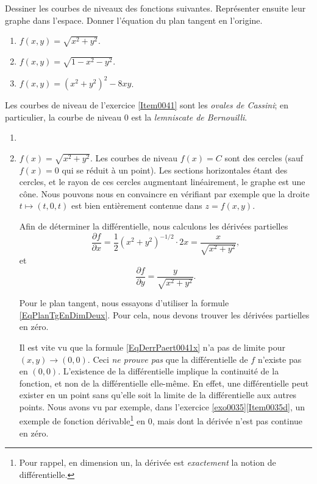 \begin{example}     \label{EXooELTHooDdJyJE}
Dessiner les courbes de niveaux des fonctions suivantes. Représenter ensuite leur graphe dans l'espace. Donner l'équation du plan tangent en l'origine.
\begin{enumerate}
\item 			$f(x,y) = \sqrt{x^2+y^2}$.
\item 			$f(x,y) = \sqrt{1-x^2-y^2}$.
\item\label{Item0041}	$f(x,y) = (x^2+y^2)^2-8xy$. 
\end{enumerate}
 Les courbes de niveau de l'exercice \ref{Item0041} sont  les \emph{ovales de Cassini}; en particulier, la courbe de niveau 0 est la \emph{lemniscate de Bernouilli}.

\begin{enumerate}
    \item
        
\item 
$f(x)=\sqrt{x^2+y^2}$. Les courbes de niveau $f(x)=C$ sont des cercles (sauf $f(x)=0$ qui se réduit à un point). Les sections horizontales étant des cercles, et le rayon de ces cercles augmentant linéairement, le graphe est une cône. Nous pouvons nous en convaincre en vérifiant par exemple que la droite $t\mapsto(t,0,t)$ est bien entièrement contenue dans $z=f(x,y)$. 

Afin de déterminer la différentielle, nous calculons les dérivées partielles
\begin{equation}		\label{EqDerrPaert0041x}
	\frac{ \partial f }{ \partial x }=\frac{1}{ 2 }(x^2+y^2)^{-1/2}\cdot 2x=\frac{ x }{ \sqrt{x^2+y^2} },
\end{equation}
et
\begin{equation}		\label{EqDerrPart0041y}
	\frac{ \partial f }{ \partial y }=\frac{ y }{ \sqrt{x^2+y^2} }.
\end{equation}

Pour le plan tangent, nous essayons d'utiliser la formule  \eqref{EqPlanTgEnDimDeux}. Pour cela, nous devons trouver les dérivées partielles en zéro. 

Il est vite vu que la formule \eqref{EqDerrPaert0041x} n'a pas de limite pour $(x,y)\to(0,0)$. Ceci \emph{ne prouve pas} que la différentielle de $f$ n'existe pas en $(0,0)$. L'existence de la différentielle implique la continuité de la fonction, et non de la différentielle elle-même. En effet, une différentielle peut exister en un point sans qu'elle soit la limite de la différentielle aux autres points. Nous avons vu par exemple, dans l'exercice \ref{exo0035}\ref{Item0035d}, un exemple de fonction dérivable\footnote{Pour rappel, en dimension un, la dérivée est \emph{exactement} la notion de différentielle.} en $0$, mais dont la dérivée n'est pas continue en zéro.


\end{enumerate}
\end{example}
